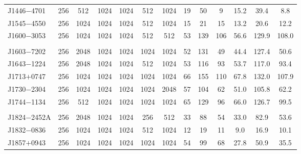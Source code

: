 \begin{landscape}
\begin{table}
\begin{center}
\begin{tabular}{lcccccccccccc}
J1446$-$4701&  256    &    512          &   1024   &  1024   &  512        &  1024    &  19     &  50         & 9        &  15.2   &    39.4          &  8.8    \\ 
J1545$-$4550&  256    &    1024         &   1024   &  1024   &  512        &  1024    &  15     &  21         & 15       &  13.2   &    20.6          &  12.2   \\ 
J1600$-$3053&  256    &    1024         &   1024   &  1024   &  512        &  512     &  53     &  139        & 106      &  56.6   &    129.9         &  108.0   \\ 
						&         &                 &          &         &             &          &         &             &          &         &                  &          \\
J1603$-$7202&  256    &    2048         &   1024   &  1024   &  1024       &  1024    &  52     &  131        & 49       &  44.4   &    127.4         &  50.6    \\ 
J1643$-$1224&  256    &    2048         &   1024   &  1024   &  512        &  1024    &  53     &  116        & 93       &  53.7   &    117.0         &  93.4     \\ 
J1713$+$0747&  256    &    1024         &   1024   &  1024   &  1024       &  1024    &  66     &  155        & 110      &  67.8   &    132.0         &  107.9    \\ 
J1730$-$2304&  256    &    1024         &   1024   &  1024   &  1024       &  2048    &  57     &  104        & 62       &  51.0   &    105.8         &  62.2    \\ 
J1744$-$1134&  256    &    512          &   1024   &  1024   &  1024       &  1024    &  65     &  129        & 96       &  66.0   &    126.7         &  99.5    \\ 
						&         &                 &          &         &             &          &         &             &          &         &                  &          \\
J1824$-$2452A&  256    &    2048         &   1024   &  1024   &  256        &  512     &  33     &  88         & 54       &  33.0   &    82.9          &  53.6    \\ 
J1832$-$0836&  256    &    1024         &   1024   &  1024   &  512        &  1024    &  12     &  19         & 11       &  9.0    &    16.9          &  10.1    \\ 
J1857$+$0943&  256    &    1024         &   1024   &  1024   &  1024       &  1024    &  54     &  99         & 68       &  27.8   &    50.9          &  35.5   \\ 

\end{tabular}
\end{center}
\end{table}
\end{landscape}
